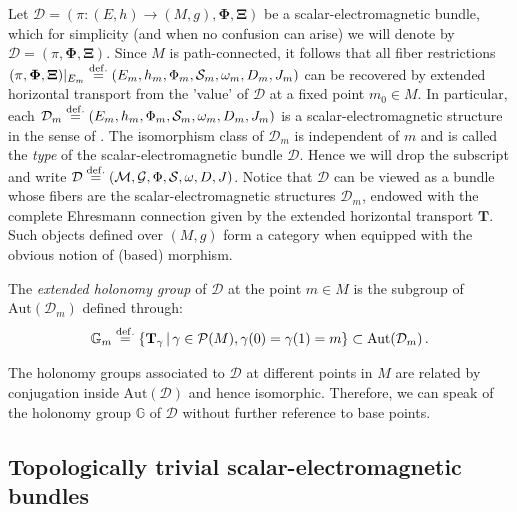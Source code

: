 \documentclass[10pt, cmp, numbook, final, a4paper]{svjour}
\newcommand{\Aut}{\mathrm{Aut}}
\newcommand{\eqdef}{\stackrel{{\rm def.}}{=}}
\def\bcD{\boldsymbol{\mathcal{D}}}
\newcommand{\be}{\begin{equation*}}
\newcommand{\ee}{\end{equation*}}
\newcommand{\cM}{\mathcal{M}}
\def\cD{\mathcal{D}}
\def\cP{\mathcal{P}}
\def\cG{\mathcal{G}}
\def\bXi{{\boldsymbol{\Xi}}}
\def\cS{\mathcal{S}}
\def\mT{\mathbf{T}}
\def\bPhi{\mathbf{\Phi}}
\def\mG{\mathbb{G}}
\begin{document}
\noindent 
Let $\bcD=(\pi:(E,h)\rightarrow (M,g), \bPhi, \bXi)$ be a
scalar-electromagnetic bundle, which for simplicity (and when no
confusion can arise) we will denote by $\bcD=(\pi, \bPhi,
\bXi)$. Since $M$ is path-connected, it follows that all fiber
restrictions $(\pi, \bPhi, \bXi)|_{E_{m}} \eqdef
(E_{m},h_{m},\Phi_{m},\cS_m,\omega_m,D_m, J_{m})$ can be recovered by
extended horizontal transport from the 'value' of $\bcD$ at a fixed
point $m_{0}\in M$. In particular, each $\cD_m\eqdef (E_m, h_m,
\Phi_m,\cS_m,\omega_m,D_m,J_m)$ is a scalar-electromagnetic structure
in the sense of \cite{GESM}. The isomorphism class of $\cD_m$ is
independent of $m$ and is called the {\em type} of the
scalar-electromagnetic bundle $\bcD$. Hence we will drop the subscript
and write $\cD \eqdef (\cM, \cG, \Phi,\cS,\omega,D,J)$. Notice that
$\bcD$ can be viewed as a bundle whose fibers are the
scalar-electromagnetic structures $\cD_m$, endowed with the
complete Ehresmann connection  given by the extended horizontal
transport $\mT$. Such objects defined over $(M,g)$ form a category
when equipped with the obvious notion of (based) morphism.

\begin{definition}
The {\em extended holonomy group} of $\bcD$ at the point $m\in M$ is the
subgroup of $\Aut(\cD_m)$ defined through:
\be
\mG_m\eqdef \{\mT_{\gamma}\,|\, \gamma\in \cP(M) , \gamma(0)=\gamma(1)=m\}\subset \Aut(\cD_m)\, .
\ee
\end{definition}

\begin{remark}
The holonomy groups associated to $\bcD$ at different points in $M$
are related by conjugation inside $\Aut(\cD)$ and hence
isomorphic. Therefore, we can speak of the holonomy group $\mG$ of
$\bcD$ without further reference to base points.
\end{remark}

\subsection{Topologically trivial scalar-electromagnetic bundles}
	
\end{document}
